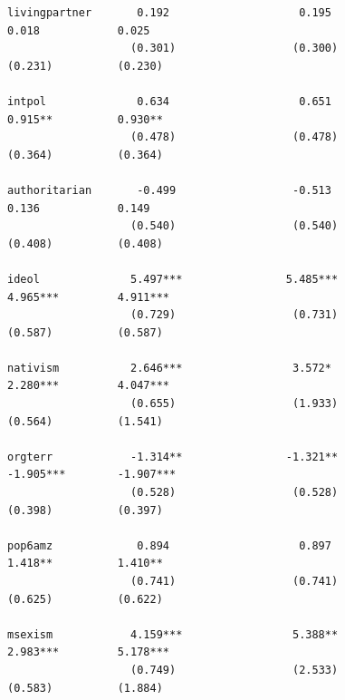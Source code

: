 \documentclass[
  letterpaper,
  DIV=11,
  numbers=noendperiod]{scrartcl}
\begin{document}
\begin{verbatim}
livingpartner       0.192                    0.195                   0.018            0.025         
                   (0.301)                  (0.300)                 (0.231)          (0.230)        
                                                                                                    
intpol              0.634                    0.651                  0.915**          0.930**        
                   (0.478)                  (0.478)                 (0.364)          (0.364)        
                                                                                                    
authoritarian       -0.499                  -0.513                   0.136            0.149         
                   (0.540)                  (0.540)                 (0.408)          (0.408)        
                                                                                                    
ideol              5.497***                5.485***                 4.965***         4.911***       
                   (0.729)                  (0.731)                 (0.587)          (0.587)        
                                                                                                    
nativism           2.646***                 3.572*                  2.280***         4.047***       
                   (0.655)                  (1.933)                 (0.564)          (1.541)        
                                                                                                    
orgterr            -1.314**                -1.321**                -1.905***        -1.907***       
                   (0.528)                  (0.528)                 (0.398)          (0.397)        
                                                                                                    
pop6amz             0.894                    0.897                  1.418**          1.410**        
                   (0.741)                  (0.741)                 (0.625)          (0.622)        
                                                                                                    
msexism            4.159***                 5.388**                 2.983***         5.178***       
                   (0.749)                  (2.533)                 (0.583)          (1.884)        
                                                                                                    

\end{verbatim}
\end{document}
